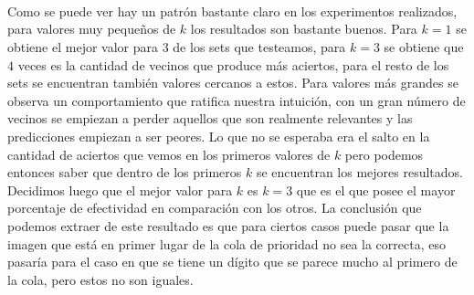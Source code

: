\\
\\ \\
Como se puede ver hay un patrón bastante claro en los experimentos realizados, para valores muy pequeños de $k$ los resultados son bastante buenos. Para $k=1$ se obtiene el mejor valor para $3$ de los sets que testeamos, para $k=3$ se obtiene que $4$ veces es la cantidad de vecinos que produce más aciertos, para el resto de los sets se encuentran también valores cercanos a estos. Para valores más grandes se observa un comportamiento que ratifica nuestra intuición, con un gran número de vecinos se empiezan a perder aquellos que son realmente relevantes y las predicciones empiezan a ser peores. Lo que no se esperaba era el salto en la cantidad de aciertos que vemos en los primeros valores de $k$ pero podemos entonces saber que dentro de los primeros $k$ se encuentran los mejores resultados.
Decidimos luego que el mejor valor para $k$ es $k=3$ que es el que posee el mayor porcentaje de efectividad en comparación con los otros. La conclusión que podemos extraer de este resultado es que para ciertos casos puede pasar que la imagen que está en primer lugar de la cola de prioridad no sea la correcta, eso pasaría para el caso en que se tiene un dígito que se parece mucho al primero de la cola, pero estos no son iguales.

